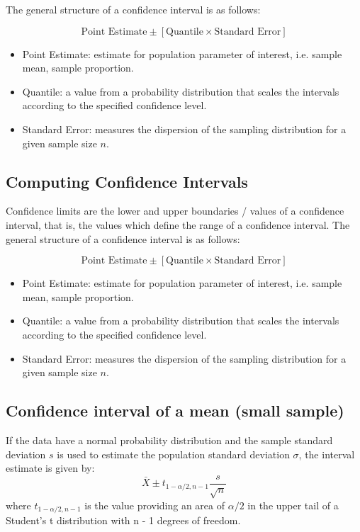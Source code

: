 
\begin{framed}
The general structure of a confidence interval is as follows:

\[ \mbox{Point Estimate}  \pm \left[ \mbox{Quantile} \times \mbox{Standard Error} \right] \]


\begin{itemize}
\item Point Estimate: estimate for population parameter of interest, i.e. sample mean, sample proportion.
\item Quantile: a value from a probability distribution that scales the intervals according to the specified confidence level.
\item Standard Error: measures the dispersion of the sampling distribution for a given sample size $n$.
\end{itemize}
\end{framed}





\subsection*{Computing Confidence Intervals}
Confidence limits are the lower and upper boundaries / values of a confidence interval, that is, the values which define the range of a confidence interval. The general structure of a confidence interval is as follows:

\[ \mbox{Point Estimate}  \pm \left[ \mbox{Quantile} \times \mbox{Standard Error} \right] \]


\begin{itemize}
\item Point Estimate: estimate for population parameter of interest, i.e. sample mean, sample proportion.
\item Quantile: a value from a probability distribution that scales the intervals according to the specified confidence level.
\item Standard Error: measures the dispersion of the sampling distribution for a given sample size $n$.
\end{itemize}



\subsection{Confidence interval of a mean (small sample)}

If the data have a normal probability distribution and the sample
standard deviation $s$ is used to estimate the population
standard deviation $\sigma$, the interval estimate is given by:
\begin{equation}
\bar{X} \pm t_{1-\alpha/2,n-1}\frac{s}{\sqrt{n}}
\end{equation}
where $t_{1-\alpha/2,n-1}$ is the value providing an area of $\alpha/2$ in the upper tail of a Student’s t distribution with n - 1 degrees of freedom.
